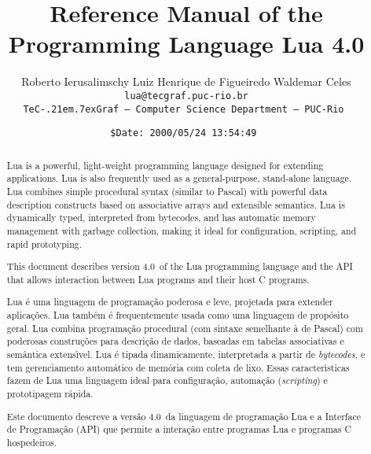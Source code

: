 \documentclass[11pt]{article}
\def\tecgraf{{\sf TeC\kern-.21em\lower.7ex\hbox{Graf}}}
\newcommand{\Version}{4.0}
\begin{document}
\title{Reference Manual of the Programming Language Lua \Version}

\author{%
Roberto Ierusalimschy\quad
Luiz Henrique de Figueiredo\quad
Waldemar Celes
\vspace{1.0ex}\\
\smallskip
\small\tt lua@tecgraf.puc-rio.br
\vspace{2.0ex}\\
\tecgraf\ --- Computer Science Department --- PUC-Rio
}

\date{{\small \tt\$Date: 2000/05/24 13:54:49 $ $}}

\maketitle

\thispagestyle{empty}
\pagestyle{empty}

\begin{abstract}
\noindent
Lua is a powerful, light-weight programming language
designed for extending applications.
Lua is also frequently used as a general-purpose, stand-alone language.
Lua combines simple procedural syntax
(similar to Pascal)
with
powerful data description constructs
based on associative arrays and extensible semantics.
Lua is
dynamically typed,
interpreted from bytecodes,
and has automatic memory management with garbage collection,
making it ideal for
configuration,
scripting,
and
rapid prototyping.

This document describes version \Version\ of the Lua programming language
and the API that allows interaction between Lua programs and their
host C programs.
\end{abstract}

\def\abstractname{Resumo}
\begin{abstract}
\noindent
Lua \'e uma linguagem de programa\c{c}\~ao
poderosa e leve,
projetada para extender aplica\c{c}\~oes.
Lua tamb\'em \'e frequentemente usada como uma linguagem de prop\'osito geral.
Lua combina programa\c{c}\~ao procedural
(com sintaxe semelhante \`a de Pascal)
com
poderosas constru\c{c}\~oes para descri\c{c}\~ao de dados,
baseadas em tabelas associativas e sem\^antica extens\'\i vel.
Lua \'e
tipada dinamicamente,
interpretada a partir de \emph{bytecodes},
e tem gerenciamento autom\'atico de mem\'oria com coleta de lixo.
Essas caracter\'{\i}sticas fazem de Lua uma linguagem ideal para
configura\c{c}\~ao,
automa\c{c}\~ao (\emph{scripting})
e prototipagem r\'apida.

Este documento descreve a vers\~ao \Version\ da linguagem de
programa\c{c}\~ao Lua e a Interface de Programa\c{c}\~ao (API) que permite
a intera\c{c}\~ao entre programas Lua e programas C hospedeiros.
\end{abstract}
\end{document}
